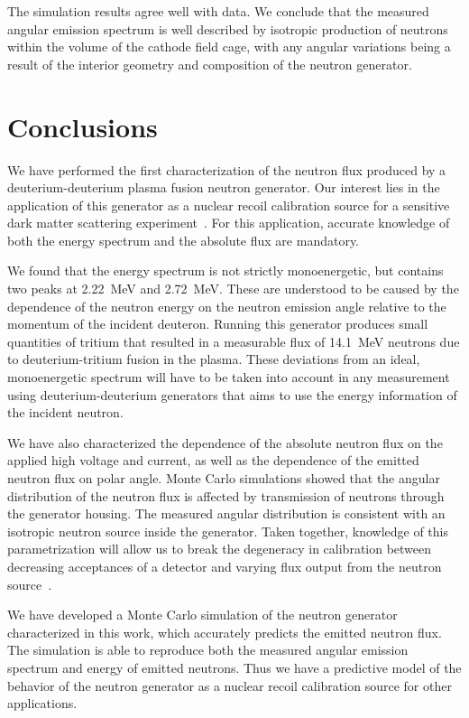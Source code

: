 The simulation results agree well with data. We conclude that the measured angular emission spectrum is well described by isotropic production of neutrons within the volume of the cathode field cage, with any angular variations being a result of the interior geometry and composition of the neutron generator.

\section{Conclusions}

We have performed the first characterization of the neutron flux produced by a deuterium-deuterium plasma fusion neutron generator. Our interest lies in the application of this generator as a nuclear recoil calibration source for a sensitive dark matter scattering experiment~\cite{xe1t:april2016}. For this application, accurate knowledge of both the energy spectrum and the absolute flux are mandatory.

We found that the energy spectrum is not strictly monoenergetic, but contains two peaks at \SI{2.22}{MeV} and \SI{2.72}{MeV}. These are understood to be caused by the dependence of the neutron energy on the neutron emission angle relative to the momentum of the incident deuteron. Running this generator produces small quantities of tritium that resulted in a measurable flux of \SI{14.1}{MeV} neutrons due to deuterium-tritium fusion in the plasma. These deviations from an ideal, monoenergetic spectrum will have to be taken into account in any measurement using deuterium-deuterium generators that aims to use the energy information of the incident neutron.

We have also characterized the dependence of the absolute neutron flux on the applied high voltage and current, as well as the dependence of the emitted neutron flux on polar angle. Monte Carlo simulations showed that the angular distribution of the neutron flux is affected by transmission of neutrons through the generator housing. The measured angular distribution is consistent with an isotropic neutron source inside the generator. Taken together, knowledge of this parametrization will allow us to break the degeneracy in calibration between decreasing acceptances of a detector and varying flux output from the neutron source~\cite{Aprile:2013teh}.

We have developed a Monte Carlo simulation of the neutron generator characterized in this work, which accurately predicts the emitted neutron flux. The simulation is able to reproduce both the measured angular emission spectrum and energy of emitted neutrons. Thus we have a predictive model of the behavior of the neutron generator as a nuclear recoil calibration source for other applications.